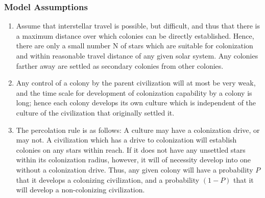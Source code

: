 \begin{frame}
\frametitle{Model Assumptions}

%
\begin{enumerate}
 
\item Assume that interstellar travel is possible, but difficult, and thus that there is a maximum distance over which colonies can be
directly established. Hence, there are only a small number N of stars which are suitable for colonization and within reasonable travel distance of any given solar system. Any colonies farther away are settled as secondary colonies from other colonies. 
\item Any control of a colony by the parent civilization will at most be very weak, and the time scale for development of colonization capability by a colony is long; hence each colony develops its own culture which is independent of the culture of the civilization that originally settled it.  
\item The percolation rule is as follows: A culture may have a colonization drive, or may not. A civilization which has a drive to colonization will establish colonies on any stars within reach. If it does not have any unsettled stars within its colonization radius, however, it will of necessity develop into one without a colonization drive. Thus, any given colony will have a probability $P$ that it develops a colonizing civilization, and a probability $(1-P)$ that it will develop a non-colonizing civilization.
\end{enumerate}
\end{frame}

